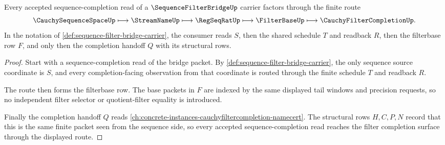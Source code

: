 \begin{theorem}\label{thm:sequence-filter-bridge-sequence-to-filter-route}
Every accepted sequence-completion read of a $\SequenceFilterBridgeUp$ carrier factors through the finite route
$$
\CauchySequenceSpaceUp \longmapsto \StreamNameUp \longmapsto \RegSeqRatUp \longmapsto \FilterBaseUp \longmapsto \CauchyFilterCompletionUp .
$$
In the notation of \autoref{def:sequence-filter-bridge-carrier}, the consumer reads $S$, then the shared schedule $T$ and readback $R$, then the filterbase row $F$, and only then the completion handoff $Q$ with its structural rows.
\end{theorem}
\begin{proof}
Start with a sequence-completion read of the bridge packet. By \autoref{def:sequence-filter-bridge-carrier}, the only sequence source coordinate is $S$, and every completion-facing observation from that coordinate is routed through the finite schedule $T$ and readback $R$.

The route then forms the filterbase row. The base packets in $F$ are indexed by the same displayed tail windows and precision requests, so no independent filter selector or quotient-filter equality is introduced.

Finally the completion handoff $Q$ reads \autoref{ch:concrete-instances-cauchyfiltercompletion-namecert}. The structural rows $H,C,P,N$ record that this is the same finite packet seen from the sequence side, so every accepted sequence-completion read reaches the filter completion surface through the displayed route.
\end{proof}

